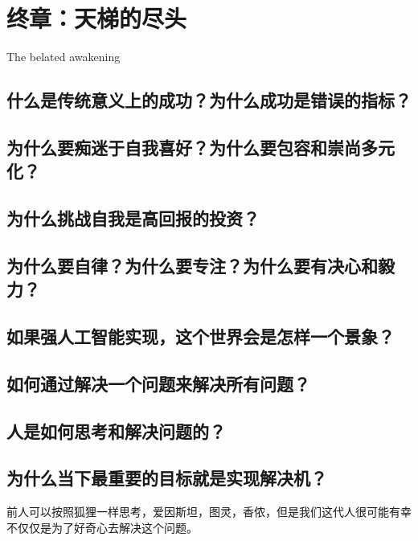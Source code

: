 \chapter{终章：天梯的尽头}

The belated awakening
\section{什么是传统意义上的成功？为什么成功是错误的指标？}
\section{为什么要痴迷于自我喜好？为什么要包容和崇尚多元化？}
\section{为什么挑战自我是高回报的投资？}
\section{为什么要自律？为什么要专注？为什么要有决心和毅力？}
\section{如果强人工智能实现，这个世界会是怎样一个景象？}
\section{如何通过解决一个问题来解决所有问题？}
\section{人是如何思考和解决问题的？}
\section{为什么当下最重要的目标就是实现解决机？}
前人可以按照狐狸一样思考，爱因斯坦，图灵，香侬，但是我们这代人很可能有幸不仅仅是为了好奇心去解决这个问题。
